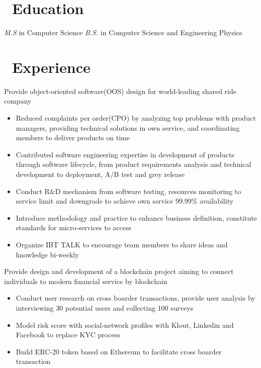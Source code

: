 \documentclass{resume}
\begin{document}



\section{\faGraduationCap\ Education}
\textit{M.S} in Computer Science
\textit{B.S.} in Computer Science and Engineering Physics

\section{\faUsers\ Experience}
Provide object-oriented software(OOS) design for world-leading shared ride company
\begin{itemize}
  \item Reduced complaints per order(CPO) by analyzing top problems with product managers, providing technical solutions in own service, and coordinating members to deliver products on time
  \item Contributed software engineering expertise in development of products through software lifecycle, from product requirements analysis and technical development to deployment, A/B test and grey release
  \item Conduct R\&D mechanism from software testing, resources monitoring to service limit and downgrade to achieve own service 99.99\% availability
  \item Introduce methodology and practice to enhance business definition, constitute standards for micro-services to access
  \item Organize IBT TALK to encourage team members to share ideas and knowledge bi-weekly
\end{itemize}

Provide design and development of a blockchain project aiming to connect individuals to modern financial service by blockchain
\begin{itemize}
  \item Conduct user research on cross boarder transactions, provide user analysis by interviewing 30 potential users and collecting 100 surveys
  \item Model risk score with social-network profiles with Klout, Linkedin and Facebook to replace KYC process
  \item Build ERC-20 token based on Ethereum to facilitate cross boarder transaction
\end{itemize}
\end{document}
